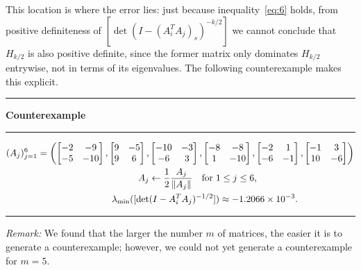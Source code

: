 \documentclass[11pt]{article}
\begin{document}
\vskip6pt
\noindent This location is where the error lies: just because inequality~\eqref{eq:6} holds, from positive definiteness of $[\det(I - (A_i^TA_j)_s)^{-k/2}]$ we cannot conclude that $H_{k/2}$ is also positive definite, since the former matrix only dominates $H_{k/2}$ entrywise, not in terms of its eigenvalues. The following counterexample makes this explicit.
\begin{center}
\rule{6cm}{0.4pt}

\textbf{Counterexample}
\vskip-4pt
\rule{6cm}{0.4pt}
\begin{small}
  \begin{equation*}
    \begin{split}
      (A_j)_{j=1}^6=\biggl(
        \begin{bmatrix}
          -2 & -9\\
          -5 & -10
        \end{bmatrix}, 
        \begin{bmatrix}
          9 & -5\\
          9 & 6
        \end{bmatrix},
        &\begin{bmatrix}
          -10 & -3\\
          -6  & 3
        \end{bmatrix},
        \begin{bmatrix}
          -8 &-8\\
          1  &-10
        \end{bmatrix},
        \begin{bmatrix}
          -2 & 1\\
          -6 &-1
        \end{bmatrix},
        \begin{bmatrix}
          -1 & 3\\
          10 &-6
        \end{bmatrix}
      \biggr)\\
      A_j &\gets \frac12 \frac{A_j}{\|{A_j}\|}\quad\text{for}\ 1\le j\le 6,\\
      \lambda_{\min}([\det&(I-A_i^TA_j)^{-1/2}]) \approx -1.2066 \times 10^{-3}.
    \end{split}
  \end{equation*}
\end{small}
\rule{10cm}{0.4pt}
\end{center}
\noindent\emph{Remark:} We found that the larger the number $m$ of matrices, the easier it is to generate a counterexample; however, we could  not yet generate a counterexample for $m=5$. 
\end{document}
